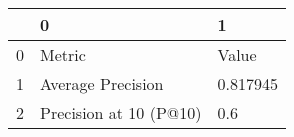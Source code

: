 \begin{tabular}{lll}
\toprule
{} &                       0 &         1 \\
\midrule
0 &                  Metric &     Value \\
1 &       Average Precision &  0.817945 \\
2 &  Precision at 10 (P@10) &       0.6 \\
\bottomrule
\end{tabular}
